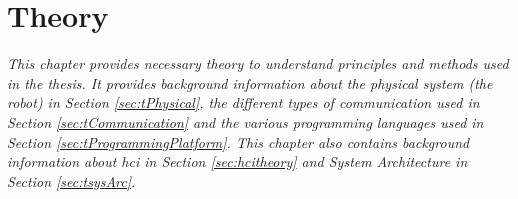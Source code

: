 \chapter{Theory}
\textit{This chapter provides necessary theory to understand principles and methods used in the thesis. It provides background information about the physical system  (the robot) in Section \ref{sec:tPhysical}, the different types of communication used in Section \ref{sec:tCommunication} and the various programming languages used in Section \ref{sec:tProgrammingPlatform}. This chapter also contains background information about \acrfull{hci} in Section \ref{sec:hcitheory} and System Architecture in Section \ref{sec:tsysArc}.}




